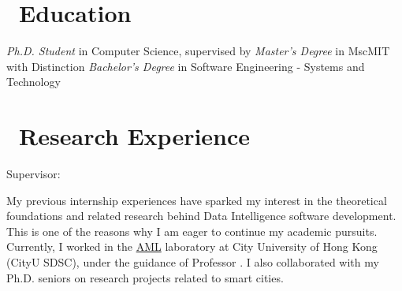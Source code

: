 \documentclass{resume}
\begin{document}



\section{\faGraduationCap\ {Education}}
\textit{Ph.D. Student} in Computer Science, supervised by {\href{https://yaoma24.github.io/}{\color{blue}{Yao Ma}} }
\textit{Master's Degree} in MscMIT with Distinction
\textit{Bachelor's Degree} in Software Engineering - Systems and Technology


\section{\faUsers\ Research Experience}
Supervisor: {\href{https://yaoma24.github.io/}{\color{blue}{Yao Ma}} }

My previous internship experiences have sparked my interest in the theoretical foundations and related research behind Data Intelligence software development. This is one of the reasons why I am eager to continue my academic pursuits. Currently, I worked in the \href{https://aml-cityu.github.io/team/}{AML} laboratory at City University of Hong Kong (CityU SDSC), under the guidance of Professor \href{https://www.cityu.edu.hk/stfprofile/xyzhao.htm}{\color{blue}{Xiangyu Zhao}} \cite{qma23}. I also collaborated with my Ph.D. seniors on research projects \cite{promptst} related to smart cities.

\href{https://github.com/VAN-QIAN/CIKM23-HIEST}{\color{blue}{Project Link}}\\
\end{document}
